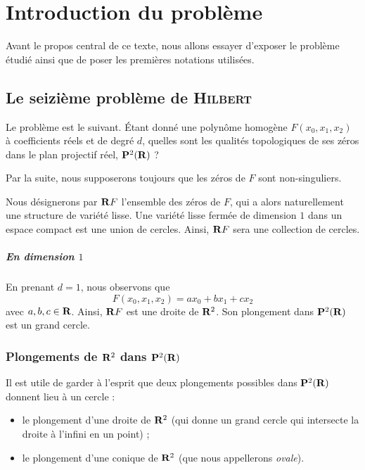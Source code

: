 \documentclass{livre}
\begin{document}
\tableofcontents

\newpage
\chapter{Introduction du problème}

Avant le propos central de ce texte, nous allons essayer d'exposer le problème étudié ainsi que de poser les premières notations utilisées.

\section{Le seizième problème de \textsc{Hilbert}}

Le problème est le suivant. \'Etant donné une polynôme homogène $F(x_0,x_1,x_2)$ à coefficients réels et de degré $d$, quelles sont les qualités topologiques de ses zéros dans le plan projectif réel, $\mathbf{P}^{2}(\mathbf{R})$ ? 

Par la suite, nous supposerons toujours que les zéros de $F$ sont non-singuliers.

Nous désignerons par $\mathbf{R} F$ l'ensemble des zéros de $F$, qui a alors  naturellement une structure de variété lisse. Une variété lisse fermée de dimension $1$ dans un espace compact est une union de cercles. Ainsi, $\mathbf{R} F$ sera une collection de cercles.


\paragraph{En dimension $1$}En prenant $d=1$, nous observons que \[ F(x_0,x_1,x_2) = ax_0 + bx_1+cx_2 \]avec $a,b,c\in \mathbf{R}$. Ainsi, $\mathbf{R} F$ est une droite de $\mathbf{R}^{2}$. Son plongement dans $\mathbf{P}^{2}(\mathbf{R})$ est un grand cercle.

\subsection*{Plongements de $\mathbf{R}^{2}$ dans $\mathbf{P}^{2}(\mathbf{R})$}

Il est utile de garder à l'esprit que deux plongements possibles dans $\mathbf{P}^{2}(\mathbf{R})$ donnent lieu à un cercle :

\begin{itemize}
\item le plongement d'une droite de $\mathbf{R}^{2}$ (qui donne un grand cercle qui intersecte la droite à l'infini en un point) ;
\item le plongement d'une conique de $\mathbf{R}^{2}$ (que nous appellerons \textit{ovale}).
\end{itemize}
\end{document}
